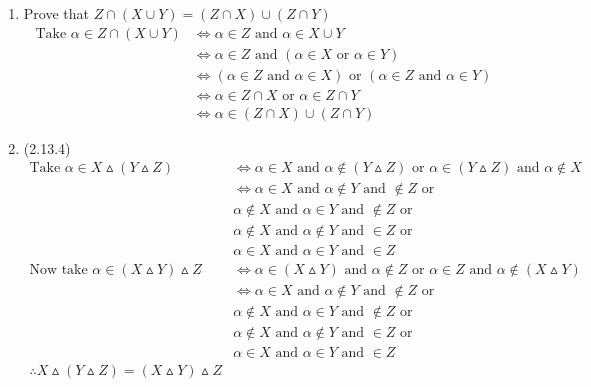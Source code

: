 \begin{enumerate}
    \item Prove that $Z \cap (X \cup Y) = (Z \cap X) \cup (Z \cap Y)$
        \begin{align*}
            \text{Take } \alpha \in Z \cap (X \cup Y) &\Leftrightarrow \alpha \in Z \text{ and } \alpha \in X \cup Y\\
            &\Leftrightarrow \alpha \in Z \text{ and } (\alpha \in X \text{ or } \alpha \in Y)\\
            &\Leftrightarrow (\alpha \in Z \text{ and } \alpha \in X) \text{ or } (\alpha \in Z \text{ and } \alpha \in Y)\\
            &\Leftrightarrow \alpha \in Z \cap X \text{ or } \alpha \in Z \cap Y\\
            &\Leftrightarrow \alpha \in (Z \cap X) \cup (Z \cap Y)
        \end{align*}

    \item (2.13.4)
    \begin{align*}
        \text{Take } \alpha \in X \vartriangle (Y \vartriangle Z) &\Leftrightarrow \alpha \in X \text{ and } \alpha \notin (Y \vartriangle Z) \text{ or } \alpha \in (Y \vartriangle Z) \text{ and } \alpha \notin X\\
        &\Leftrightarrow \alpha \in X \text{ and } \alpha \notin Y \text{ and } \notin Z \text{ or }\\ 
        &\alpha \notin X \text{ and } \alpha \in Y \text{ and } \notin Z \text{ or }\\ 
        &\alpha \notin X \text{ and } \alpha \notin Y \text{ and } \in Z \text{ or }\\ 
        &\alpha \in X \text{ and } \alpha \in Y \text{ and } \in Z\\
        \text{Now take } \alpha \in (X \vartriangle Y) \vartriangle Z &\Leftrightarrow \alpha \in (X \vartriangle Y) \text{ and } \alpha \notin Z \text{ or } \alpha \in Z \text{ and } \alpha \notin (X \vartriangle Y)\\
        &\Leftrightarrow \alpha \in X \text{ and } \alpha \notin Y \text{ and } \notin Z \text{ or }\\ 
        &\alpha \notin X \text{ and } \alpha \in Y \text{ and } \notin Z \text{ or }\\ 
        &\alpha \notin X \text{ and } \alpha \notin Y \text{ and } \in Z \text{ or }\\ 
        &\alpha \in X \text{ and } \alpha \in Y \text{ and } \in Z\\
        \therefore X \vartriangle (Y \vartriangle Z) = (X \vartriangle Y) \vartriangle Z
    \end{align*}


\end{enumerate}
